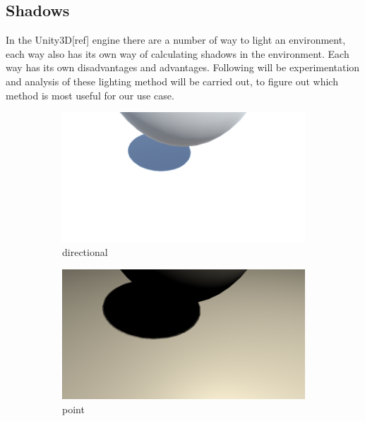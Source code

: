 \subsection{Shadows}

In the Unity3D[ref] engine there are a number of way to light an environment, each way also has its own way of calculating shadows in the environment. Each way has its own disadvantages and advantages. Following will be experimentation and analysis of these lighting method will be carried out, to figure out which method is most useful for our use case. 


\begin{figure}
\centering
\begin{subfigure}[t]{0.33\textwidth}
\centering
\includegraphics[width=\linewidth]{figures/shadows/directional-cleaned}
\caption{directional}
\label{fig:directional}
\end{subfigure}%
    \hfill
\begin{subfigure}[t]{0.33\textwidth}
\centering
\includegraphics[width=\linewidth]{figures/shadows/point-cleaned}
\caption{point}
\label{fig:point}
\end{subfigure}%
    \hfill
\begin{subfigure}[t]{0.33\textwidth}

\end{subfigure}
\end{figure}
